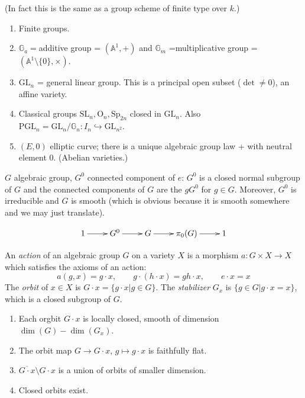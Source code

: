 (In fact this is the same as a group scheme
of finite type over $k$.)

\begin{example}
\label{example-algebraic-groups}
\begin{enumerate}
\item Finite groups.
\item $\mathbb{G}_a=$additive group =
$(\mathbb{A}^1,+)$ and $\mathbb{G}_m$
=multiplicative group =
$(\mathbb{A}^1\setminus\{0\},\times)$.
\item $\text{GL}_n$ = general linear group.
This is a principal open subset
($\det \neq 0$), an affine variety.
\item Classical groups
$\text{SL}_n,\text{O}_n,\text{Sp}_{2n}$
closed in
$\text{GL}_n$. Also
$\text{PGL}_n=\text{GL}_n/\mathbb{G}
_n:I_n\hookrightarrow\text{GL}_{n^2}$.
\item $(E,0)$ elliptic curve; there is a
unique algebraic group law + with
neutral element $0$. (Abelian varieties.)
\end{enumerate}
\end{example}

\begin{proposition}
\label{git-label-004}
$G$ algebraic group, $G^0$ connected
component of $e$: $G^0$ is a closed normal
subgroup of $G$ and the connected components
of $G$ are the $gG^0$ for $g \in G$.
Moreover, $G^0$ is irreducible and $G$ is
smooth (which is obvious because it is smooth
somewhere and we may just translate).
\end{proposition}
$$
\xymatrix{
1\ar[r]&G^0\ar[r]&G\ar[r]&\pi_0(G)\ar[r]&1
}
$$
\begin{definition}
\label{definition-action-of-algebraic-group}
An {\it action} of an algebraic group $G$ on
a variety $X$ is a morphism $a:G
\times X \to X$ which satisfies the axioms of
an action:
$$
a(g,x)=g\cdot x,\qquad  g\cdot(h\cdot
x)=gh\cdot x,\qquad  e\cdot x=x
$$
The {\it orbit} of $x \in X$ is $G\cdot
x=\{g\cdot x|g \in G\}$. The {\it stabilizer}
$G_x$ is $\{g \in G|g\cdot x=x\}$, which is a
closed subgroup of $G$.
\end{definition}

\begin{proposition}
\label{proposition-properties-of-orbit}
\begin{enumerate}
\item Each orgbit $G\cdot x$ is locally
closed, smooth of dimension
$\dim(G)-\dim(G_x)$.
\item The orbit map $G \to G\cdot x$, $g
\mapsto  g\cdot x$ is faithfully flat.
\item $\overline{G\cdot x}\setminus G\cdot x$
is a union of orbits of smaller
dimension.
\item Closed orbits exist.
\end{enumerate}
\end{proposition}

